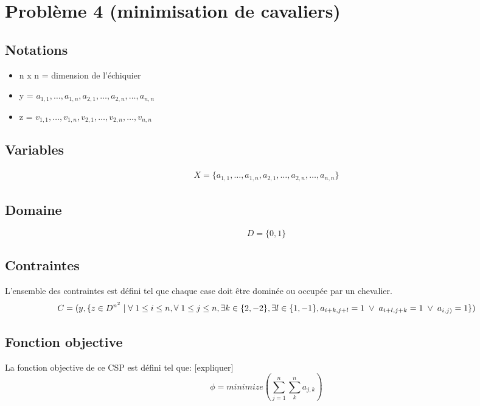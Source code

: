 \documentclass[a4paper,11pt]{article}
\begin{document}
\section{Problème 4 (minimisation de cavaliers)}
\subsection{Notations}
\begin{itemize}
\item n x n = dimension de l'échiquier
\item y = $a_{1,1},\ldots, a_{1,n},a_{2,1}, \ldots,a_{2,n}, \ldots, a_{n,n} $
\item z = $v_{1,1},\ldots, v_{1,n},v_{2,1}, \ldots,v_{2,n}, \ldots, v_{n,n} $
\end{itemize}

\subsection{Variables}
\begin{equation}
  \begin{split}
    X = \{a_{1,1},\ldots, a_{1,n},a_{2,1}, \ldots,a_{2,n}, \ldots, a_{n,n} \}
  \end{split}
\end{equation}

\subsection{Domaine}
$$D = \{ 0, 1 \}$$

\subsection{Contraintes}
L'ensemble des contraintes est défini tel que chaque case doit être dominée ou occupée par un chevalier. 
  $$ C = (y, \{z \in D^{n^2} \hspace{0.1cm} | \hspace{0.1cm} \forall \hspace{0.1cm} 1 \leq i \leq n, \forall \hspace{0.1cm} 1 \leq j \leq n, \exists k \in \{2,-2\}, \exists l \in \{1,-1\}, a_{i+k,j+l}=1 \hspace{0.1cm} \vee \hspace{0.1cm} a_{i+l,j+k}=1 \hspace{0.1cm} \vee \hspace{0.1cm} a_{i,j)} = 1\}) $$ 

\subsection{Fonction objective}

La fonction objective de ce CSP est défini tel que: [expliquer]
  $$ \phi = minimize(\sum_{j=1}^{n} \sum_{k}^n a_{j,k}) $$
  
\end{document}

